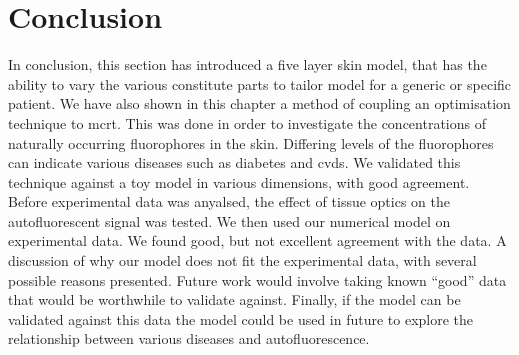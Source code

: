 \section{Conclusion}

In conclusion, this section has introduced a five layer skin model, that has the ability to vary the various constitute parts to tailor model for a generic or specific patient.
We have also shown in this chapter a method of coupling an optimisation technique to \gls*{mcrt}.
This was done in order to investigate the concentrations of naturally occurring fluorophores in the skin.
Differing levels of the fluorophores can indicate various diseases such as diabetes and \gls*{cvds}.
We validated this technique against a toy model in various dimensions, with good agreement.
Before experimental data was anyalsed, the effect of tissue optics on the autofluorescent signal was tested.
We then used our numerical model on experimental data. We found good, but not excellent agreement with the data.
A discussion of why our model does not fit the experimental data, with several possible reasons presented.
Future work would involve taking known ``good'' data that would be worthwhile to validate against.
Finally, if the model can be validated against this data the model could be used in future to explore the relationship between various diseases and autofluorescence.


